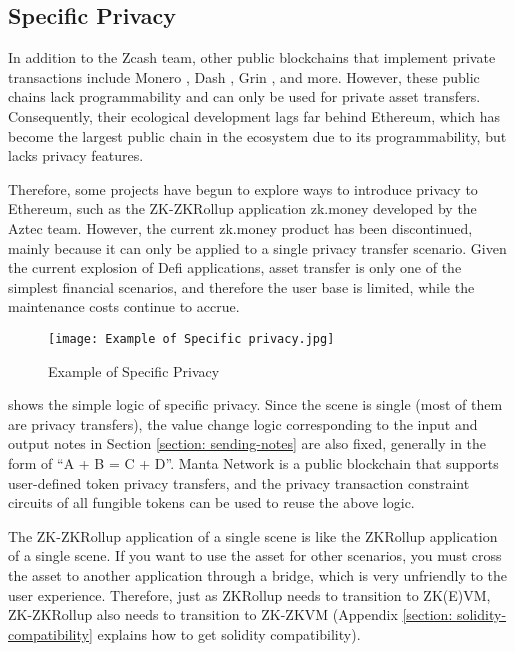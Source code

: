 \subsection{Specific Privacy}

In addition to the Zcash team, other public blockchains that implement private transactions include Monero \cite{website:Monero}, Dash \cite{website:Dash}, Grin \cite{website:Grin}, and more. However, these public chains lack programmability and can only be used for private asset transfers. Consequently, their ecological development lags far behind Ethereum, which has become the largest public chain in the ecosystem due to its programmability, but lacks privacy features.

Therefore, some projects have begun to explore ways to introduce privacy to Ethereum, such as the ZK-ZKRollup application zk.money \cite{website:zk.money} developed by the Aztec \cite{website:Aztec} team. However, the current zk.money product has been discontinued, mainly because it can only be applied to a single privacy transfer scenario. Given the current explosion of Defi applications, asset transfer is only one of the simplest financial scenarios, and therefore the user base is limited, while the maintenance costs continue to accrue.
\begin{figure}[!ht]
    \centering
    \texttt{[image: Example of Specific privacy.jpg]}
    \caption{Example of Specific Privacy}
    \label{fig:Example of Specific privacy}
\end{figure}

 shows the simple logic of specific privacy. Since the scene is single (most of them are privacy transfers), the value change logic corresponding to the input and output notes in Section \ref{section: sending-notes} are also fixed, generally in the form of ``A + B = C + D''. Manta Network \cite{website:Manta-network} is a public blockchain that supports user-defined token privacy transfers, and the privacy transaction 
constraint circuits of all fungible tokens can be used to reuse the above logic.

The ZK-ZKRollup application of a single scene is like the ZKRollup application of a single scene. If you want to use the asset for other scenarios, you must cross the asset to another application through a bridge, which is very unfriendly to the user experience. Therefore, just as ZKRollup needs to 
transition to ZK(E)VM, ZK-ZKRollup also needs to transition to ZK-ZKVM (Appendix \ref{section: solidity-compatibility} explains how to get solidity compatibility).
